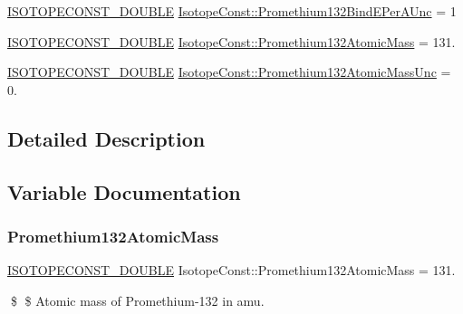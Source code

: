 \begin{DoxyCompactItemize}
\mbox{\hyperlink{group___isotope_const-_macros_ga8f45a7272ce02c0b4c65c44636ed719a}{I\+S\+O\+T\+O\+P\+E\+C\+O\+N\+S\+T\+\_\+\+D\+O\+U\+B\+LE}} \mbox{\hyperlink{group___isotope_const-_promethium-_pm132_ga5ea65edaf2476c3f262633494c75baa2}{Isotope\+Const\+::\+Promethium132\+Bind\+E\+Per\+A\+Unc}} = 1
\item 
\mbox{\hyperlink{group___isotope_const-_macros_ga8f45a7272ce02c0b4c65c44636ed719a}{I\+S\+O\+T\+O\+P\+E\+C\+O\+N\+S\+T\+\_\+\+D\+O\+U\+B\+LE}} \mbox{\hyperlink{group___isotope_const-_promethium-_pm132_gad69be77115783d41b0f962d376bdb974}{Isotope\+Const\+::\+Promethium132\+Atomic\+Mass}} = 131.
\item 
\mbox{\hyperlink{group___isotope_const-_macros_ga8f45a7272ce02c0b4c65c44636ed719a}{I\+S\+O\+T\+O\+P\+E\+C\+O\+N\+S\+T\+\_\+\+D\+O\+U\+B\+LE}} \mbox{\hyperlink{group___isotope_const-_promethium-_pm132_ga4f37f81893c5e4fc0ee633eb27de5af6}{Isotope\+Const\+::\+Promethium132\+Atomic\+Mass\+Unc}} = 0.
\end{DoxyCompactItemize}


\subsection{Detailed Description}


\subsection{Variable Documentation}
\mbox{\label{group___isotope_const-_promethium-_pm132_gad69be77115783d41b0f962d376bdb974}} 
\subsubsection{\texorpdfstring{Promethium132\+Atomic\+Mass}{Promethium132AtomicMass}}
{\footnotesize\ttfamily \mbox{\hyperlink{group___isotope_const-_macros_ga8f45a7272ce02c0b4c65c44636ed719a}{I\+S\+O\+T\+O\+P\+E\+C\+O\+N\+S\+T\+\_\+\+D\+O\+U\+B\+LE}} Isotope\+Const\+::\+Promethium132\+Atomic\+Mass = 131.}

\$ \$ Atomic mass of Promethium-\/132 in amu. \mbox{\label{group___isotope_const-_promethium-_pm132_ga4f37f81893c5e4fc0ee633eb27de5af6}} 
